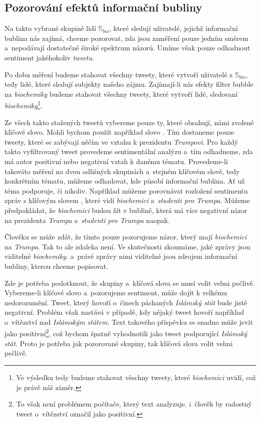 \documentclass[12pt, a4paper]{article}
\numberwithin{equation}{section} 	%
\begin{document}
\subsection{Pozorování efektů informační bubliny}
\noindent Na takto vybrané skupině lidí $\mathbb{S}_{bio}$, které sledují uživatelé, jejichž informační bublina nás zajímá, chceme pozorovat, zda jsou zaměření pouze jedním směrem a~nepodávají dostatečně široké spektrum názorů. Umíme však pouze odhadnout sentiment jakéhokoliv \textit{tweetu}.

Po dobu měření budeme stahovat všechny tweety, které vytvoří uživatelé z $\mathbb{S}_{bio}$, tedy lidé, které sledují subjekty našeho zájmu. Zajímají-li nás efekty filter bubble na \textit{biochemiky} budeme stahovat všechny tweety, které vytvoří lidé, sledovaní \textit{biochemiky}\footnote{Ve výsledku tedy budeme stahovat všechny tweety, které \textit{biochemici} uvidí, což je právě náš záměr.}.

Ze všech takto stažených tweetů vybereme pouze ty, které obsahují, námi zvolené klíčové slovo. Mohli bychom použít například slovo \textit{}. Tím dostaneme pouze tweety, které se zabývají něčím ve vztahu k prezidentu \textit{Trumpovi}. Pro každý takto vyfiltrovaný tweet provedeme sentimentální analýzu a~tím odhadneme, zda má autor positivní nebo negativní vztah k danému tématu. Provedeme-li takováto měření na dvou odlišných skupinách a~stejném klíčovém slově, tedy konkrétním tématu, můžeme odhadovat, kde působí informační bublina. Ať už téma podporuje, či nikoliv. Například můžeme porovnávat rozložení sentimentu zpráv s klíčovým slovem \textit{}, které vidí \textit{biochemici} a~\textit{studenti pro Trumpa}. Můžeme předpokládat, že \textit{biochemici} budou žít v bublině, která má více negativní názor na prezidenta \textit{Trumpa} a~\textit{studenti pro Trumpa} naopak.

Člověku se může zdát, že tímto pouze pozorujeme názor, který mají \textit{biochemici} na \textit{Trumpa}. Tak to ale zdaleka není. Ve skutečnosti zkoumáme, jaké zprávy jsou viditelné \textit{biochemiky}. a~právě zprávy nimi viditelné jsou zdrojem informační bubliny, kterou chceme popisovat.

Zde je potřeba podotknout, že skupiny a~klíčová slova se musí volit velmi pečlivě. Vybereme-li klíčové slovo \textit{} a~pozorujeme sentiment, může dojít k velkému nedorozumění. Tweet, který hovoří o~činech páchaných \textit{Islámský stát} bude jistě negativní. Problém však nastává v případě, kdy nějaký tweet hovoří například o~vítězství nad \textit{Islámským státem}. Text takového příspěvku se snadno může jevit jako positivní\footnote{To však není problémem počítače, který text analyzuje. i~člověk by radostný tweet o~vítězství označil jako positivní.}, což bychom špatně vyhodnotili jako tweet podporující \textit{Islámský stát}. Proto je potřeba jak pozorované skupiny, tak klíčová slova volit velmi pečlivě.
\end{document}
